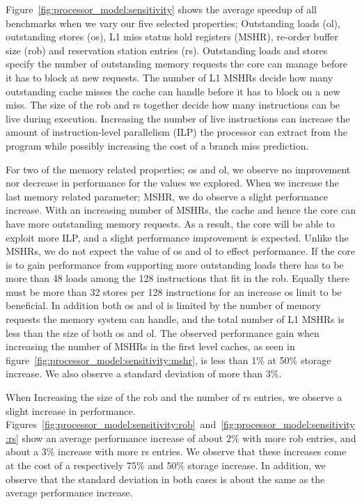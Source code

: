 Figure~\ref{fig:processor_model:sensitivity} shows the average speedup of all benchmarks when we vary our five selected properties; Outstanding loads (ol), outstanding stores (os), L1 miss status hold registers (MSHR), re-order buffer size (rob) and reservation station entries (rs).
Outstanding loads and stores specify the number of outstanding memory requests the core can manage before it has to block at new requests.
The number of L1 MSHRs decide how many outstanding cache misses the cache can handle before it has to block on a new miss.
The size of the rob and rs together decide how many instructions can be live during execution.  
Increasing the number of live instructions can increase the amount of instruction-level parallelism (ILP) the processor can extract from the program while possibly increasing the cost of a branch miss prediction.

For two of the memory related properties; os and ol, we observe no improvement nor decrease in performance for the values we explored.
When we increase the last memory related parameter; MSHR, we do observe a slight performance increase.
With an increasing number of MSHRs, the cache and hence the core can have more outstanding memory requests. 
As a result, the core will be able to exploit more ILP, and a slight performance improvement is expected. 
Unlike the MSHRs, we do not expect the value of os and ol to effect performance. 
If the core is to gain performance from supporting more outstanding loads there has to be more than 48 loads among the 128 instructions that fit in the rob. 
Equally there must be more than 32 stores per 128 instructions for an increase os limit to be beneficial.
In addition both os and ol is limited by the number of memory requests the memory system can handle, and the total number of L1 MSHRs is less than the size of both os and ol.
The observed performance gain when increasing the number of MSHRs in the first level caches, as seen in figure~\ref{fig:processor_model:sensitivity:mshr}, is less than 1\% at 50\% storage increase. 
We also observe a standard deviation of more than 3\%. 

When Increasing the size of the rob and the number of rs entries, we observe a slight increase in performance.
Figures~\ref{fig:processor_model:sensitivity:rob}~and~\ref{fig:processor_model:sensitivity:rs} show an average performance increase of about 2\% with more rob entries, and about a 3\% increase with more rs entries.
We observe that these increases come at the cost of a respectively 75\% and 50\% storage increase.
In addition, we observe that the standard deviation in both cases is about the same as the average performance increase.

